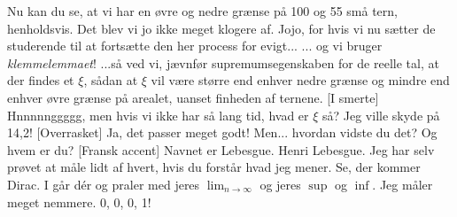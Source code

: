 \documentclass[a4paper,11pt]{article}
\begin{document}
\begin{sketch}
 Nu kan du se, at vi har en øvre og nedre grænse på 100 og 55 små tern, henholdsvis.
 Det blev vi jo ikke meget klogere af.
 Jojo, for hvis vi nu sætter de studerende til at fortsætte den her process for evigt...
 ... og vi bruger \textit{klemmelemmaet}!
 ...så ved vi, jævnfør supremumsegenskaben for de reelle tal, at der findes et $\xi$, sådan at $\xi$ vil være større end enhver nedre grænse og mindre end enhver øvre grænse på arealet, uanset finheden af ternene.
[I smerte] Hnnnnnggggg, men hvis vi ikke har så lang tid, hvad er $\xi$ så?
 Jeg ville skyde på 14,2!
[Overrasket] Ja, det passer meget godt! Men... hvordan vidste du det? Og hvem er du?
[Fransk accent] Navnet er Lebesgue. Henri Lebesgue. Jeg har selv prøvet at måle lidt af hvert, hvis du forstår hvad jeg mener.
 Se, der kommer Dirac. 
 I går dér og praler med jeres $\lim_{n \to \infty}$ og jeres $\sup$ og $\inf$. Jeg måler meget nemmere.
 0, 0, 0,  1! 












\end{sketch}
\end{document}
